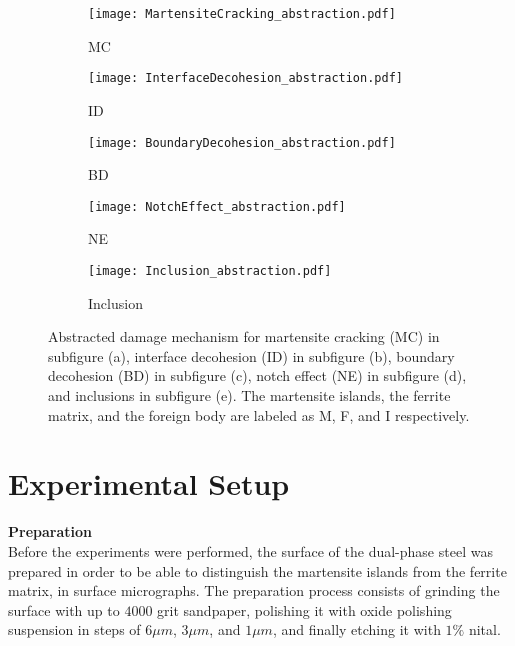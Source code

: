 \begin{figure}
\begin{subfigure}{.2\textwidth}
\centering
  \texttt{[image: MartensiteCracking\_abstraction.pdf]}
  \caption{MC}
  \label{fig:MC}
\end{subfigure}%
\begin{subfigure}{.2\textwidth}
\centering
  \texttt{[image: InterfaceDecohesion\_abstraction.pdf]}
  \caption{ID}
  \label{fig:Interface_scalebar}
\end{subfigure}%
\centering
\begin{subfigure}{.2\textwidth}
\centering
  \texttt{[image: BoundaryDecohesion\_abstraction.pdf]}
  \caption{BD}
  \label{fig:Inclusion_scalebar}
\end{subfigure}%
\begin{subfigure}{.2\textwidth}
\centering
  \texttt{[image: NotchEffect\_abstraction.pdf]}
  \caption{NE}
  \label{fig:Notch_scalebar}
\end{subfigure}%
\centering
\begin{subfigure}{.2\textwidth}
\centering
  \texttt{[image: Inclusion\_abstraction.pdf]}
  \caption{Inclusion}
  \label{fig:Inclusion_scalebar}
\end{subfigure}%
\caption{Abstracted damage mechanism for martensite cracking (MC) in subfigure (a), interface decohesion (ID) in subfigure (b), boundary decohesion (BD) in subfigure (c), notch effect (NE) in subfigure (d), and inclusions in subfigure (e). The martensite islands, the ferrite matrix, and the foreign body are labeled as M, F, and I respectively.}
\label{fig:DamageCategories_abstraction}
\end{figure}

\section{Experimental Setup}

\textbf{Preparation} \\
Before the experiments were performed, the surface of the dual-phase steel was prepared in order to be able to distinguish the martensite islands from the ferrite matrix, in surface micrographs. The preparation process consists of grinding the surface with up to $4000$ grit sandpaper, polishing it with oxide polishing suspension in steps of $6\mu m$, $3\mu m$, and $1\mu m$, and finally etching it with $1 \%$ nital. \\

